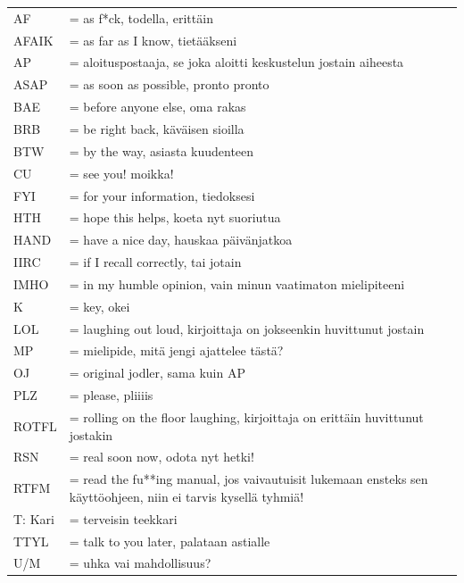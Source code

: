 \documentclass[a5paper, 8pt, twocolumn]{book} %
\numberwithin{equation}{section}
\begin{document}
\begin{table}[h!]
	\begin{tabularx}{\textwidth}{lX}
		AF &= as f*ck, todella, erittäin \\
		AFAIK &= as far as I know, tietääkseni \\
		AP &= aloituspostaaja, se joka aloitti keskustelun jostain aiheesta \\
		ASAP &= as soon as possible, pronto pronto \\
		BAE &= before anyone else, oma rakas \\
		BRB &= be right back, käväisen sioilla \\
		BTW &= by the way, asiasta kuudenteen \\
		CU &= see you! moikka! \\
		FYI &= for your information, tiedoksesi \\
		HTH &= hope this helps, koeta nyt suoriutua \\
		HAND &= have a nice day, hauskaa päivänjatkoa \\
		IIRC &= if I recall correctly, tai jotain \\
		IMHO &= in my humble opinion, vain minun vaatimaton mielipiteeni \\
		K &= key, okei \\
		LOL &= laughing out loud, kirjoittaja on jokseenkin huvittunut jostain \\
		MP &= mielipide, mitä jengi ajattelee tästä? \\
		OJ &= original jodler, sama kuin AP \\
		PLZ &= please, pliiiis \\
		ROTFL &= rolling on the floor laughing, kirjoittaja on erittäin huvittunut jostakin\\
		RSN &= real soon now, odota nyt hetki! \\
		RTFM &= read the fu**ing manual, jos vaivautuisit lukemaan ensteks sen käyttöohjeen, niin ei tarvis kysellä tyhmiä! \\
		T: Kari &= terveisin teekkari \\
		TTYL &= talk to you later, palataan astialle \\
		U/M &= uhka vai mahdollisuus?
	\end{tabularx}
\end{table}
\end{document}
